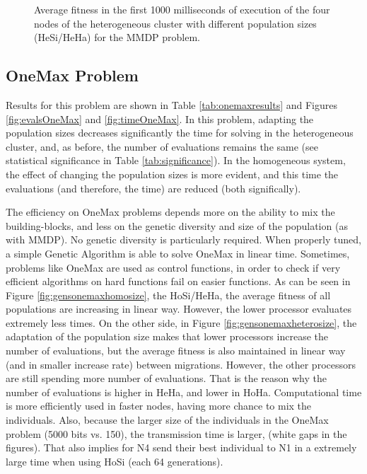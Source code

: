 \begin{figure*}
\centering
{} %
\caption{Average fitness in the first 1000 milliseconds of execution of the four nodes of the heterogeneous cluster with different population sizes (HeSi/HeHa) for the MMDP problem.}
\label{fig:hesiheha}
\end{figure*}



\subsection{OneMax Problem}

Results for this problem are shown in Table \ref{tab:onemaxresults} and Figures \ref{fig:evalsOneMax} and \ref{fig:timeOneMax}. In this problem, adapting the population sizes decreases significantly the time for solving in the heterogeneous cluster, and, as before, the number of evaluations remains the same (see statistical significance in Table \ref{tab:significance}). In the homogeneous system, the effect of changing the population sizes is more evident, and this time the evaluations (and therefore, the time) are reduced (both significally). 

The efficiency on OneMax problems depends more on the ability to mix the building-blocks, and less on the genetic diversity and size of the population (as with MMDP). No genetic diversity is particularly required. When properly tuned, a simple Genetic Algorithm is able to solve OneMax in linear time. Sometimes, problems like OneMax are used as control functions, in order to check if very efficient algorithms on hard functions fail on easier functions. As can be seen in Figure \ref{fig:gensonemaxhomosize}, the HoSi/HeHa, the average fitness of all populations are increasing in linear way. However, the lower processor evaluates extremely less times.  On the other side, in Figure \ref{fig:gensonemaxheterosize}, the adaptation of the population size makes that lower processors increase the number of evaluations, but the average fitness is also maintained in linear way (and in smaller increase rate) between migrations. However, the other processors are still spending more number of evaluations. That is the reason why the number of evaluations is higher in HeHa, and lower in HoHa. Computational time is more efficiently used in faster nodes, having more chance to mix the individuals. Also, because the larger size of the individuals in the OneMax problem (5000 bits vs. 150), the transmission time is larger, (white gaps in the figures). That also implies for N4 send their best individual to N1 in a extremely large time when using HoSi (each 64 generations).

